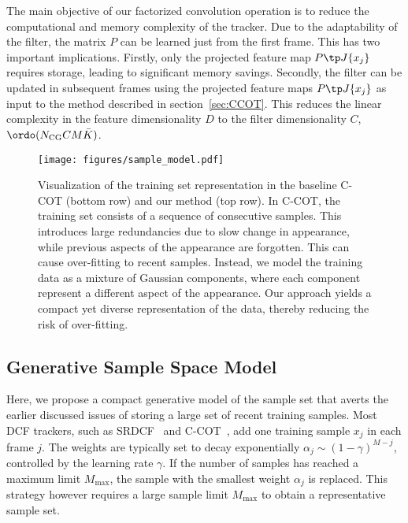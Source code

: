 \documentclass[10pt,twocolumn,letterpaper]{article}
\begin{document}
The main objective of our factorized convolution operation is to reduce the computational and memory complexity of the tracker. Due to the adaptability of the filter, the matrix $P$ can be learned just from the first frame. This has two important implications. Firstly, only the projected feature map $P\tp J\{x_j\}$ requires storage, leading to significant memory savings. Secondly, the filter can be updated in subsequent frames using the projected feature maps $P\tp J\{x_j\}$ as input to the method described in section~\ref{sec:CCOT}. This reduces the linear complexity in the feature dimensionality $D$ to the filter dimensionality $C$, \ie $\ordo(N_\text{CG} C M \bar{K})$.

\begin{figure*}[!t]
	\centering \newcommand{\wid}{0.86\textwidth}\texttt{[image: figures/sample\_model.pdf]}\vspace{-2mm}
	\caption{Visualization of the training set representation in the baseline C-COT (bottom row) and our method (top row). In C-COT, the training set consists of a sequence of consecutive samples. This introduces large redundancies due to slow change in appearance, while previous aspects of the appearance are forgotten. This can cause over-fitting to recent samples. Instead, we model the training data as a mixture of Gaussian components, where each component represent a different aspect of the appearance. Our approach yields a compact yet diverse representation of the data, thereby reducing the risk of over-fitting.
	}\vspace{-3mm}\label{fig:sample_model}
\end{figure*}

\subsection{Generative Sample Space Model}
\label{sec:sample_model}

Here, we propose a compact generative model of the sample set that averts the earlier discussed issues of storing a large set of recent training samples. Most DCF trackers, such as SRDCF~\cite{DanelljanICCV2015} and C-COT~\cite{DanelljanECCV2016}, add one training sample $x_j$ in each frame $j$. The weights are typically set to decay exponentially $\alpha_j \sim (1 - \gamma)^{M-j}$, controlled by the learning rate $\gamma$. If the number of samples has reached a maximum limit $M_\text{max}$, the sample with the smallest weight $\alpha_j$ is replaced. This strategy however requires a large sample limit $M_\text{max}$ to obtain a representative sample set.
\end{document}
